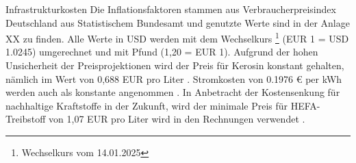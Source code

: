 
Infrastrukturkosten
%
Die Inflationsfaktoren stammen aus Verbraucherpreisindex Deutschland aus Statistischem Bundesamt und genutzte Werte sind in der Anlage XX zu finden.
Alle Werte in USD werden mit dem Wechselkurs \footnote{Wechselkurs vom 14.01.2025} (EUR 1 = USD 1.0245) umgerechnet und mit Pfund (1,20 = EUR 1).
Aufgrund der hohen Unsicherheit der Preisprojektionen wird der Preis für Kerosin konstant gehalten, nämlich im Wert von
0,688 EUR pro Liter \cite{iata_industry_statistics_2024}. Stromkosten von 0.1976 € per kWh werden auch als konstante angenommen \cite{eurostat_nrg_pc_205}.
In Anbetracht der Kostensenkung für nachhaltige Kraftstoffe in der Zukunft, wird der minimale Preis für HEFA-Treibstoff 
von 1,07 EUR pro Liter wird in den Rechnungen verwendet \cite{watson2024sustainable}.







